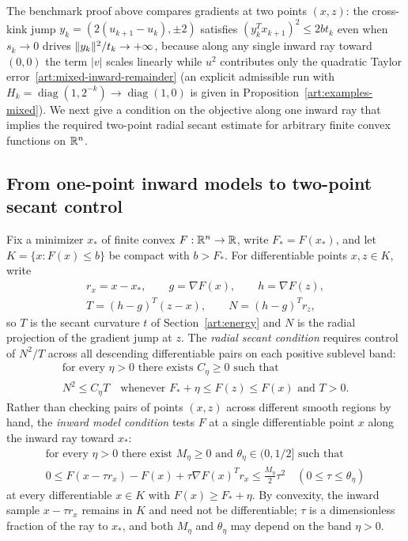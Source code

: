 The benchmark proof above compares gradients at two points $(x,z)$: the
cross-kink jump $y_k=(2(u_{k+1}-u_k),\pm2)$ satisfies $(y_k^Tx_{k+1})^2\le2bt_k$
even when $s_k\to0$ drives $\lVert y_k\rVert^2/t_k\to+\infty$, because along any
single inward ray toward $(0,0)$ the term $|v|$ scales linearly while $u^2$
contributes only the quadratic Taylor error~\eqref{art:mixed-inward-remainder}
(an explicit admissible run with $H_k=\operatorname{diag}(1,2^{-k})\to\operatorname{diag}(1,0)$
is given in Proposition~\ref{art:examples-mixed}). We next give a condition on
the objective along one inward ray that implies the required two-point radial
secant estimate for arbitrary finite convex functions on $\mathbb R^n$.

\subsection{From one-point inward models to two-point secant control}

Fix a minimizer $x_*$ of finite convex $F:\mathbb R^n\to\mathbb R$, write $F_*=F(x_*)$, and
let $K=\{x:F(x)\le b\}$ be compact with $b>F_*$. For differentiable points
$x,z\in K$, write
\[
 \begin{gathered}
 r_x=x-x_*,\qquad g=\nabla F(x),\qquad h=\nabla F(z),\\
 T=(h-g)^T(z-x),\qquad N=(h-g)^Tr_z,
 \end{gathered}
\]
so $T$ is the secant curvature $t$ of Section~\ref{art:energy} and $N$ is the
radial projection of the gradient jump at $z$. The \emph{radial secant
condition} requires control of $N^2/T$ across all descending differentiable
pairs on each positive sublevel band:
\begin{equation}\label{art:radial-condition}
 \begin{gathered}
 \text{for every }\eta>0\text{ there exists }C_\eta\ge0\text{ such that}\\
 N^2\le C_\eta T
 \quad\text{whenever }F_*+\eta\le F(z)\le F(x)\text{ and }T>0.
 \end{gathered}
\end{equation}
Rather than checking pairs of points $(x,z)$ across different smooth regions by
hand, the \emph{inward model condition} tests $F$ at a single differentiable
point $x$ along the inward ray toward $x_*$:
\begin{equation}\label{art:inward-condition}
 \begin{gathered}
 \text{for every }\eta>0\text{ there exist }M_\eta\ge0\text{ and }
       \theta_\eta\in(0,1/2]\text{ such that}\\
 0\le F(x-\tau r_x)-F(x)+\tau\nabla F(x)^Tr_x
       \le\frac{M_\eta}{2}\tau^2\quad(0\le\tau\le\theta_\eta)
 \end{gathered}
\end{equation}
at every differentiable $x\in K$ with $F(x)\ge F_*+\eta$. By convexity, the
inward sample $x-\tau r_x$ remains in $K$ and need not be differentiable; $\tau$
is a dimensionless fraction of the ray to $x_*$, and both $M_\eta$ and
$\theta_\eta$ may depend on the band $\eta>0$.

